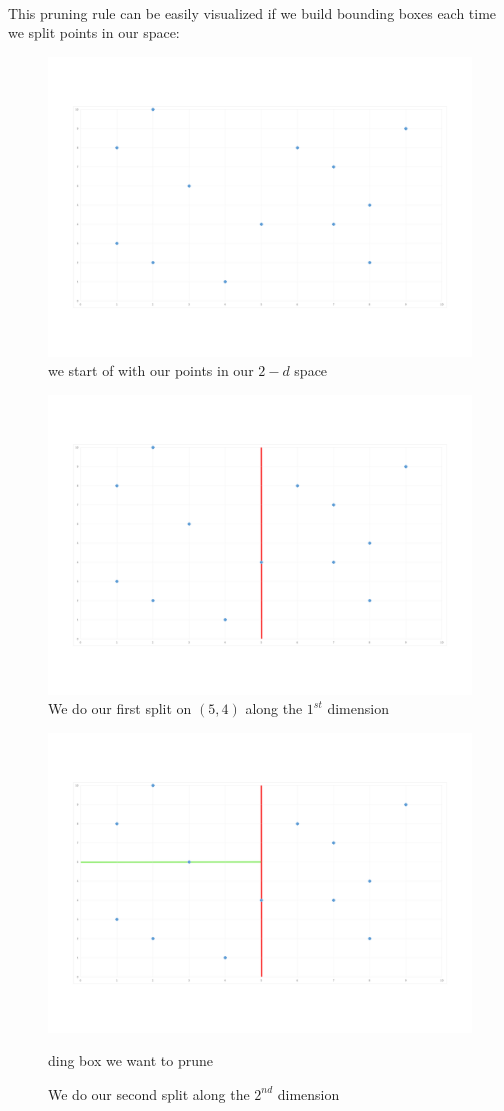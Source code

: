 \documentclass[11 pt]{article}
\begin{document}
\paragraph{}This pruning rule can be easily visualized if we build bounding boxes each time we split points in our space:
\begin{figure}[H]
  \centering
  \includegraphics[width=.7\textwidth]{figures/Base.png}
  \caption{we start of with our points in our $2-d$ space}
  \label{base}
\end{figure}
\begin{figure}[H]
  \centering
  \includegraphics[width=.7\textwidth]{figures/split1.png}
  \caption{We do our first split on $(5,4)$ along the $1^{st}$ dimension}
  \label{split1}
\end{figure}
\begin{figure}[H]
  \centering
  \includegraphics[width=.7\textwidth]{figures/split2.png}
  \caption{We do our second split along the $2^{nd}$ dimension}ding box we want to prune
  \label{split2}
\end{figure}
\end{document}

